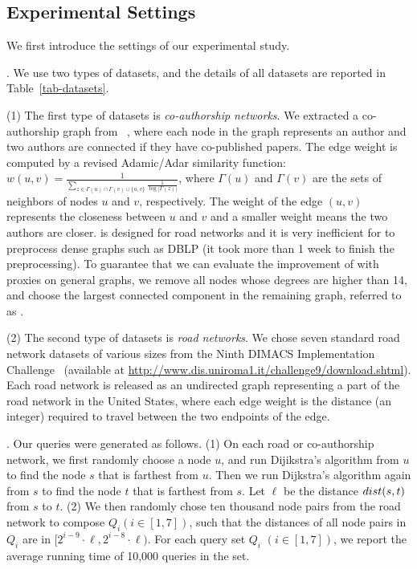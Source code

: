 \subsection{Experimental Settings}
We first introduce the settings of our experimental study.







.
We use two types of datasets, and the details of all datasets are reported in Table~\ref{tab-datasets}.



\sstab (1) The first type of datasets is {\em co-authorship networks}. We extracted a co-authorship graph from \dblp~\cite{snapnets}, where each node in the graph represents an author and two authors are connected if they have co-published papers. The edge weight is computed by a revised Adamic/Adar similarity function: $w(u,v) = \frac{1}{\sum_{z\in {\Gamma(u)\cap \Gamma(v) \cup \{u,v\}}}\frac{1}{\log{|\Gamma(z)|}}}$, where $\Gamma(u)$ and $\Gamma(v)$ are the sets of neighbors of nodes $u$ and $v$, respectively. The weight of the edge $(u,v)$ represents the closeness between $u$ and $v$ and a smaller weight means the two authors are closer. \tnr is designed for road networks and it is very inefficient for \tnr to preprocess dense graphs such as DBLP (it took more than 1 week to finish the preprocessing). To guarantee that we can evaluate the improvement of \tnr with proxies on general graphs, we remove all nodes whose degrees are higher than 14, and choose the largest connected component in the remaining graph, referred to as \dblpone.


\sstab (2) The second type of datasets is {\em road networks}. We chose seven standard road network datasets of various sizes from the Ninth DIMACS
Implementation Challenge~\cite{dimacs-datasets} (available at {\url{http://www.dis.uniroma1.it/challenge9/download.shtml}}). Each road network is released as an undirected graph representing a part of the road network in the United States, where each edge weight is the distance (an integer) required to travel between the two endpoints of the edge.


. Our queries were generated as follows.
(1) On each road  or co-authorship network, we first randomly choose a node $u$, and run Dijikstra's algorithm from $u$ to find the node $s$ that is farthest from $u$. Then we run Dijkstra's algorithm again from $s$ to find the node $t$ that is farthest from $s$. Let $\ell$ be the distance $\dist(s,t)$ from $s$ to $t$.
(2) We then randomly chose ten thousand node pairs from
the road network to compose $Q_i (i \in [1,7])$, such that the
distances of all node pairs in $Q_i$ are in $[2^{i-9}\cdot\ell, 2^{i-8}\cdot\ell)$.
For each query set $Q_i$ $(i\in [1,7])$, we report the average running time of 10,000 queries in the set.

